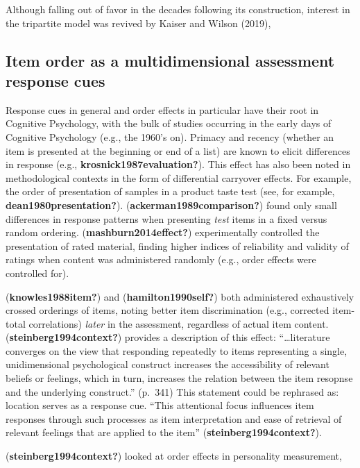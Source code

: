 \documentclass[
  man]{apa7}
\begin{document}
Although falling out of favor in the decades following its construction, interest in the tripartite model was revived by Kaiser and Wilson (2019),

\hypertarget{item-order-as-a-multidimensional-assessment-response-cues}{%
\subsection{Item order as a multidimensional assessment response cues}\label{item-order-as-a-multidimensional-assessment-response-cues}}

Response cues in general and order effects in particular have their root in Cognitive Psychology, with the bulk of studies occurring in the early days of Cognitive Psychology (e.g., the 1960's on). Primacy and recency (whether an item is presented at the beginning or end of a list) are known to elicit differences in response (e.g., \textbf{krosnick1987evaluation?}). This effect has also been noted in methodological contexts in the form of differential carryover effects. For example, the order of presentation of samples in a product taste test (see, for example, \textbf{dean1980presentation?}). (\textbf{ackerman1989comparison?}) found only small differences in response patterns when presenting \emph{test} items in a fixed versus random ordering. (\textbf{mashburn2014effect?}) experimentally controlled the presentation of rated material, finding higher indices of reliability and validity of ratings when content was administered randomly (e.g., order effects were controlled for).

(\textbf{knowles1988item?}) and (\textbf{hamilton1990self?}) both administered exhaustively crossed orderings of items, noting better item discrimination (e.g., corrected item-total correlations) \emph{later} in the assessment, regardless of actual item content. (\textbf{steinberg1994context?}) provides a description of this effect: ``\ldots literature converges on the view that responding repeatedly to items representing a single, unidimensional psychological construct increases the accessibility of relevant beliefs or feelings, which in turn, increases the relation between the item resopnse and the underlying construct.'' (p.~341) This statement could be rephrased as: location serves as a response cue. ``This attentional focus influences item responses through such processes as item interpretation and ease of retrieval of relevant feelings that are applied to the item'' (\textbf{steinberg1994context?}).

(\textbf{steinberg1994context?}) looked at order effects in personality measurement,
\end{document}
